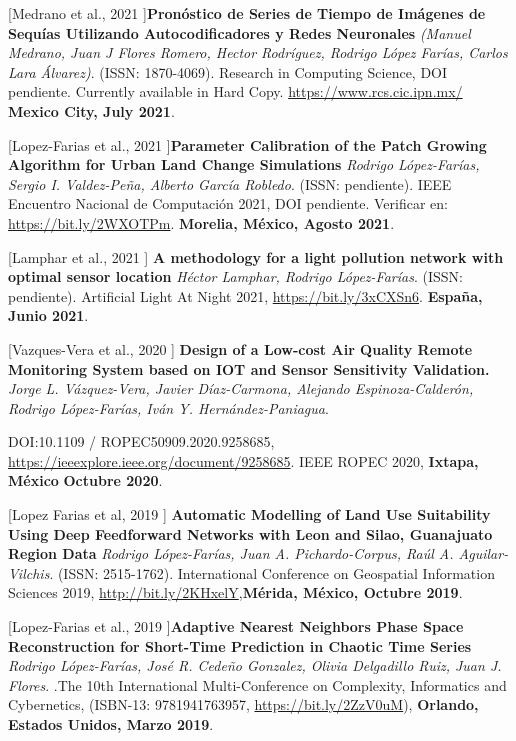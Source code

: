 \begin{innerlist}



\item [[Medrano et al., 2021]]\textbf{Pronóstico de Series de Tiempo de Imágenes de Sequías Utilizando Autocodificadores y Redes Neuronales} \textit{(Manuel Medrano, Juan J Flores Romero, Hector Rodríguez, Rodrigo López Farías, Carlos Lara Álvarez)}. (ISSN: 1870-4069). {Research in Computing Science}, DOI pendiente.  Currently available in Hard Copy. \url{https://www.rcs.cic.ipn.mx/} \textbf{Mexico City, July 2021}. 

\item [[Lopez-Farias et al., 2021]]\textbf{Parameter Calibration of the Patch Growing Algorithm for Urban Land Change Simulations} \textit{Rodrigo López-Farías, Sergio I. Valdez-Peña, Alberto García Robledo}. (ISSN: pendiente). {IEEE Encuentro Nacional de Computación 2021}, DOI pendiente.  Verificar en: \url{https://bit.ly/2WXOTPm}. \textbf{Morelia, México, Agosto 2021}. 

\item [[Lamphar et al., 2021]] \textbf{A methodology for a light pollution network with optimal sensor location} \textit{Héctor Lamphar, Rodrigo López-Farías}. (ISSN: pendiente). {Artificial Light At Night 2021},  \url{https://bit.ly/3xCXSn6}.  \textbf{España, Junio 2021}. 

\item [[Vazques-Vera et al., 2020]] \textbf{Design of a Low-cost Air Quality Remote Monitoring System based on IOT and Sensor Sensitivity Validation.} \textit{Jorge L. Vázquez-Vera, Javier Díaz-Carmona, Alejando Espinoza-Calderón, Rodrigo López-Farías, Iván Y. Hernández-Paniagua}. 

DOI:10.1109 / ROPEC50909.2020.9258685, 
\url{https://ieeexplore.ieee.org/document/9258685}. {IEEE ROPEC 2020}, \textbf{Ixtapa, México} \textbf{Octubre 2020}. 



\item [[Lopez Farias et al, 2019]] \textbf{Automatic Modelling of Land Use Suitability Using Deep Feedforward Networks with Leon and
Silao, Guanajuato Region Data} \textit{Rodrigo López-Farías, Juan A. Pichardo-Corpus, Raúl A. Aguilar-Vilchis}. (ISSN: 2515-1762). {International Conference on Geospatial Information Sciences 2019}, \url{http://bit.ly/2KHxelY},\textbf{Mérida, México, Octubre 2019}. 

\item [[Lopez-Farias et al., 2019]]\textbf{Adaptive Nearest Neighbors Phase Space Reconstruction for Short-Time Prediction in Chaotic Time Series} \textit{Rodrigo López-Farías, José R. Cedeño Gonzalez, Olivia Delgadillo Ruiz, Juan J. Flores}.  .{The 10th International Multi-Conference on Complexity, Informatics and Cybernetics}, (ISBN-13: 9781941763957, \url{https://bit.ly/2ZzV0uM}), \textbf{Orlando, Estados Unidos, Marzo 2019}.



\end{innerlist}
